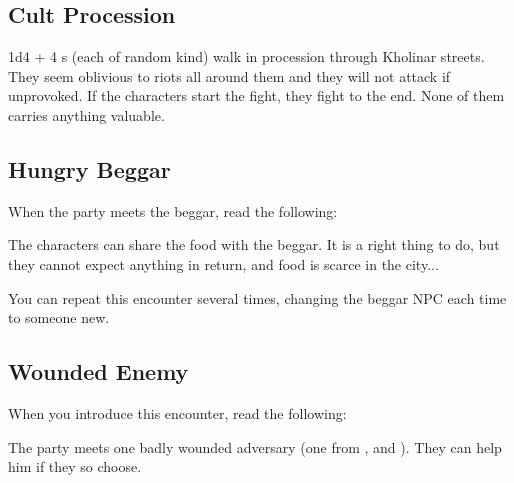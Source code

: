 \subsection{Cult Procession}

1d4 + 4 \enemyCultist{}s (each \enemyCultistOfMoments{} of random kind) walk in procession through Kholinar streets. They seem oblivious to riots all around them and they will not attack if unprovoked. If the characters start the fight, they fight to the end. None of them carries anything valuable.





\subsection{Hungry Beggar}

When the party meets the beggar, read the following:


The characters can share the food with the beggar. It is a right thing to do, but they cannot expect anything in return, and food is scarce in the city...

You can repeat this encounter several times, changing the beggar NPC each time to someone new.



\subsection{Wounded Enemy}

When you introduce this encounter, read the following:


The party meets one badly wounded adversary (one from \enemyWallGuard{}, \enemyRioter{} and \enemyCultistOfMoments{}). They can help him if they so choose.





